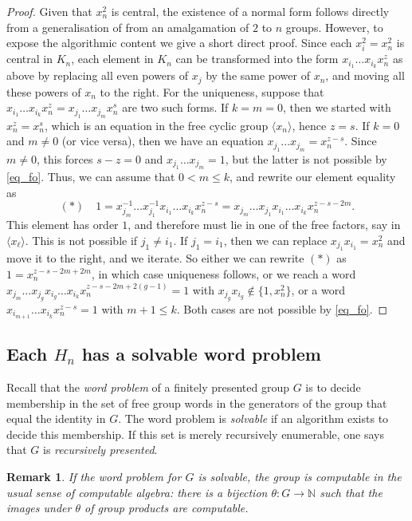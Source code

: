 \documentclass[11pt]{amsart}
\theoremstyle{mythm}
\theoremstyle{mydef}
\theoremstyle{myrem}
\newtheorem{remark}[theorem]{Remark}
\numberwithin{equation}{section}
\renewcommand{\leq}{\leqslant}
\begin{document}
 
\begin{proof} 
Given that $x_n^2$ is central,  the existence of a normal form follows directly from a  generalisation of \cite[Theorem IV.2.6]{LS} from an amalgamation of $2$ to  $n$ groups. However, to expose the algorithmic content we give a short direct proof. Since each $x_i^2=x_n^2$ is central in $K_n$, each  element in $K_n$ can be transformed into the form   $x_{i_1}\ldots x_{i_k}x_n^z$ as above   by replacing all even powers of $x_j$ by the same  power of $x_n$, and moving all these powers of $x_n$ to the right.  For  the uniqueness, suppose  that $x_{i_1} \ldots x_{i_k}  x_n^z =   x_{j_1} \ldots x_{j_m}  x_n^s$ are two such forms.   If $k=m=0$, then we started with $x_n^z=x_n^s$, which is an equation in the free cyclic group $\langle x_n\rangle$, hence $z=s$. If $k=0$ and $m\ne 0$ (or vice versa), then we have an equation $x_{j_1} \ldots x_{j_m}=  x_n^{z-s}$. Since $m\ne 0$, this forces $s-z=0$ and $x_{j_1} \ldots x_{j_m}=1$, but the latter is not possible by \eqref{eq_fo}. Thus, we can assume that $0<m\leq k$, and rewrite our element equality as 
  \[(\ast)\quad 1=x_{j_m}^{-1}\ldots x_{j_1}^{-1}x_{i_1} \ldots x_{i_k}  x_n^{z-s}=x_{j_m}\ldots x_{j_1}x_{i_1}\ldots x_{i_k} x_n^{z-s-2m}.\]This element has order $1$, and therefore must lie in one of the free factors, say in $\langle x_\ell\rangle$. This is not possible if $j_1\ne i_1$. If $j_1=i_1$, then we can replace $x_{j_1}x_{i_1}=x_n^2$ and move it to the right, and we iterate. So either we can rewrite $(\ast)$ as $1=x_n^{z-s-2m+2m}$, in which case uniqueness follows, or we reach  a word $x_{j_m}\ldots x_{j_g}x_{i_g}\ldots x_{i_k} x_n^{z-s-2m+2(g-1)}=1$ with $x_{j_g}x_{i_g}\notin \{1,x_n^2\}$, or a word $x_{i_{m+1}}\ldots x_{i_k} x_n^{z-s}=1$ with $m+1\leq k$. Both cases are not possible by \eqref{eq_fo}.
\end{proof} 


\subsection{Each $H_n$ has a solvable word problem}
Recall that the \textit{word problem} of a finitely presented group $G$  is to decide membership in the set  of  free group words in the generators of the group that  equal the identity in $G$. The word problem is \textit{solvable} if  an algorithm exists to decide this membership. If this set is merely recursively enumerable, one  says that  $G$ is \textit{recursively presented}.

\begin{remark} \label{Malcev} If the word problem for $G$ is solvable, the group is computable in the usual sense of computable algebra: there is a bijection  $\theta \colon G \to \mathbb N$ such that the images under $\theta$ of group products are computable. 
 \end{remark}
\end{document}
